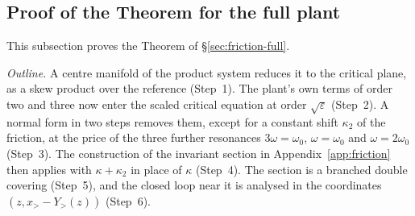 \documentclass[11pt,reqno]{amsart}
\theoremstyle{plain}
\theoremstyle{definition}
\theoremstyle{remark}
\begin{document}
\subsection{Proof of the Theorem for the full plant}\label{app:friction-full}
This subsection proves the Theorem of \S\ref{sec:friction-full}.

\emph{Outline.} A centre manifold of the product system reduces it to the critical plane, as a skew product
over the reference (Step~1). The plant's own terms of order two and three now enter the scaled critical equation
at order $\sqrt\varepsilon$ (Step~2). A normal form in two steps removes them, except for a constant shift
$\kappa_2$ of the friction, at the price of the three further resonances $3\omega=\omega_0$, $\omega=\omega_0$ and
$\omega=2\omega_0$ (Step~3). The construction of the invariant section in Appendix~\ref{app:friction} then
applies with $\kappa+\kappa_2$ in place of $\kappa$ (Step~4). The section is a branched double covering (Step~5), and
the closed loop near it is analysed in the coordinates $(z,x_>-Y_>(z))$ (Step~6).
\end{document}
